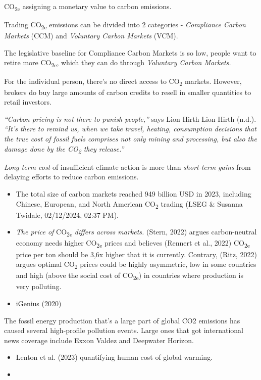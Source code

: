 \documentclass[
  letterpaper,
  DIV=11,
  numbers=noendperiod]{scrartcl}
\providecommand{\tightlist}{%
  \setlength{\itemsep}{0pt}\setlength{\parskip}{0pt}}\usepackage{longtable,booktabs,array}
\begin{document}
CO\textsubscript{2e} assigning a monetary value to carbon emissions.

Trading CO\textsubscript{2e} emissions can be divided into 2 categories
- \emph{Compliance Carbon Markets} (CCM) and \emph{Voluntary Carbon
Markets} (VCM).

The legislative baseline for Compliance Carbon Markets is so low, people
want to retire more CO\textsubscript{2e}, which they can do through
\emph{Voluntary Carbon Markets.}

For the individual person, there's no direct access to
CO\textsubscript{2} markets. However, brokers do buy large amounts of
carbon credits to resell in smaller quantities to retail investors.

\emph{``Carbon pricing is not there to punish people,''} says Lion Hirth
Lion Hirth (n.d.). \emph{``It's there to remind us, when we take travel,
heating, consumption decisions that the true cost of fossil fuels
comprises not only mining and processing, but also the damage done by
the CO\textsubscript{2} they release.''}

\emph{Long term cost} of insufficient climate action is more than
\emph{short-term gains} from delaying efforts to reduce carbon
emissions.

\begin{itemize}
\item
  The total size of carbon markets reached 949 billion USD in 2023,
  including Chinese, European, and North American CO\textsubscript{2}
  trading (LSEG \& Susanna Twidale, 02/12/2024, 02:37 PM).
\item
  \emph{The price of} CO\textsubscript{2e} \emph{differs across
  markets.} (Stern, 2022) argues carbon-neutral economy needs higher
  CO\textsubscript{2e} prices and believes (Rennert et al., 2022)
  CO\textsubscript{2e} price per ton should be 3,6x higher that it is
  currently. Contrary, (Ritz, 2022) argues optimal CO\textsubscript{2}
  prices could be highly asymmetric, low in some countries and high
  (above the social cost of CO\textsubscript{2e}) in countries where
  production is very polluting.
\item
  iGenius (2020)
\end{itemize}

The fossil energy production that's a large part of global CO2 emissions
has caused several high-profile pollution events. Large ones that got
international news coverage include Exxon Valdez and Deepwater Horizon.

\begin{itemize}
\tightlist
\item
  Lenton et al. (2023) quantifying human cost of global warming.
\item
\end{itemize}
\end{document}
